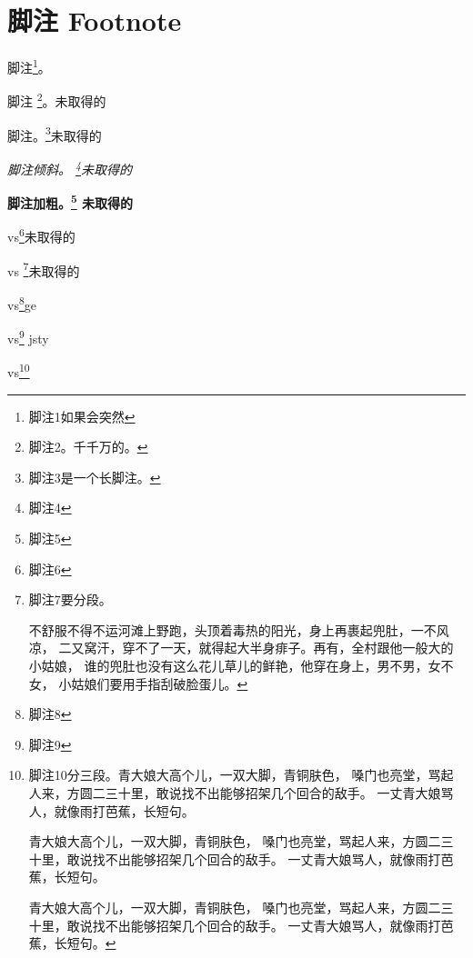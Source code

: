 \chapter{脚注 Footnote}

脚注\footnote{脚注1如果会突然}。

脚注 \footnote{脚注2。千千万的。}。未取得的

脚注。\footnote{脚注3是一个长脚注。\zhlipsum*[2]}未取得的

\textit{脚注倾斜。 \footnote{脚注4}未取得的}

\textbf{脚注加粗。\footnote{脚注5} 未取得的}

vs\footnote{脚注6}未取得的

vs \footnote{脚注7要分段。\par 不舒服不得不运河滩上野跑，头顶着毒热的阳光，身上再裹起兜肚，一不风凉，
二又窝汗，穿不了一天，就得起大半身痱子。再有，全村跟他一般大的小姑娘，
谁的兜肚也没有这么花儿草儿的鲜艳，他穿在身上，男不男，女不女，
小姑娘们要用手指刮破脸蛋儿。}未取得的

vs\footnote{脚注8}ge

vs\footnote{脚注9} jsty

vs\footnote{脚注10分三段。青大娘大高个儿，一双大脚，青铜肤色，
嗓门也亮堂，骂起人来，方圆二三十里，敢说找不出能够招架几个回合的敌手。
一丈青大娘骂人，就像雨打芭蕉，长短句。\par
青大娘大高个儿，一双大脚，青铜肤色，
嗓门也亮堂，骂起人来，方圆二三十里，敢说找不出能够招架几个回合的敌手。
一丈青大娘骂人，就像雨打芭蕉，长短句。 \par
青大娘大高个儿，一双大脚，青铜肤色，
嗓门也亮堂，骂起人来，方圆二三十里，敢说找不出能够招架几个回合的敌手。
一丈青大娘骂人，就像雨打芭蕉，长短句。}

